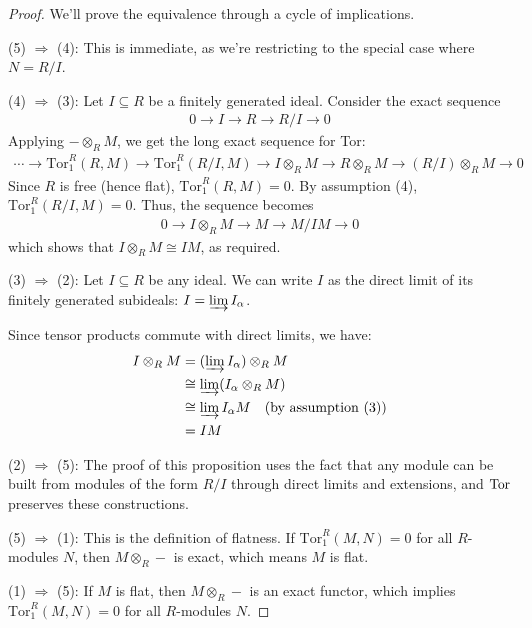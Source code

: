\documentclass[12pt]{article}
\begin{document}
\begin{proof}
    We'll prove the equivalence through a cycle of implications.

    \noindent (5) $\Rightarrow$ (4): This is immediate, as we're restricting to the special case where $N = R/I$.

    \noindent (4) $\Rightarrow$ (3): Let $I \subseteq R$ be a finitely generated ideal. Consider the exact sequence
    \begin{align*}
        0 \to I \to R \to R/I \to 0
    \end{align*}
    Applying $-\otimes_R M$, we get the long exact sequence for Tor:
    \begin{align*}
        \cdots \to \text{Tor}_1^R(R,M) \to \text{Tor}_1^R(R/I,M) \to I \otimes_R M \to R \otimes_R M \to (R/I) \otimes_R M \to 0
    \end{align*}
    Since $R$ is free (hence flat), $\text{Tor}_1^R(R,M) = 0$. By assumption (4), $\text{Tor}_1^R(R/I,M) = 0$. Thus, the sequence becomes
    \begin{align*}
        0 \to I \otimes_R M \to M \to M/IM \to 0
    \end{align*}
    which shows that $I \otimes_R M \cong IM$, as required.

    \noindent (3) $\Rightarrow$ (2): Let $I \subseteq R$ be any ideal. We can write $I$ as the direct limit of its finitely generated subideals: $I = \varinjlim I_\alpha$.

    Since tensor products commute with direct limits, we have:
    \begin{align*}
        I \otimes_R M & = (\varinjlim I_\alpha) \otimes_R M                          \\
                      & \cong \varinjlim (I_\alpha \otimes_R M)                      \\
                      & \cong \varinjlim I_\alpha M \quad \text{(by assumption (3))} \\
                      & = IM
    \end{align*}

    \noindent (2) $\Rightarrow$ (5): The proof of this proposition uses the fact that any module can be built from modules of the form $R/I$ through direct limits and extensions, and $\operatorname{Tor}$ preserves these constructions.


    \noindent (5) $\Rightarrow$ (1): This is the definition of flatness. If $\text{Tor}_1^R(M,N) = 0$ for all $R$-modules $N$, then $M \otimes_R -$ is exact, which means $M$ is flat.

    \noindent (1) $\Rightarrow$ (5): If $M$ is flat, then $M \otimes_R -$ is an exact functor, which implies $\text{Tor}_1^R(M,N) = 0$ for all $R$-modules $N$.
\end{proof}
\end{document}
